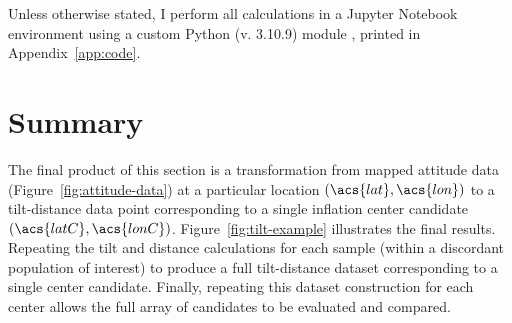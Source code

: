 Unless otherwise stated, I perform all calculations in a Jupyter Notebook environment using a custom Python (v. 3.10.9) module , printed in Appendix~\ref{app:code}.







\section{Summary}

The final product of this section is a transformation from mapped attitude data (Figure~\ref{fig:attitude-data}) at a particular location $(\acs{lat}, \acs{lon})$ to a tilt-distance data point corresponding to a single inflation center candidate $(\acs{latC}, \acs{lonC})$. Figure~\ref{fig:tilt-example} illustrates the final results. Repeating the tilt and distance calculations for each sample (within a discordant population of interest) to produce a full tilt-distance dataset corresponding to a single center candidate. Finally, repeating this dataset construction for each center allows the full array of candidates to be evaluated and compared.